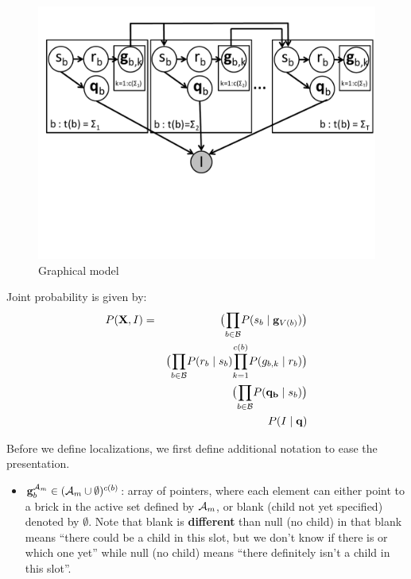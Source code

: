 \documentclass[11pt]{article}
\newcommand{\A}{{\cal A}}
\newcommand{\X}{\mathbf{X}}
\newcommand{\B}{\cal B}
\newcommand{\Am}{\A_{m}}
\begin{document}
\begin{figure}[htbp]
\begin{center}
\includegraphics[width=\textwidth, trim=0cm 6cm 0cm 0cm]{gm.pdf}
\caption{Graphical model}
\end{center}
\end{figure}

\FloatBarrier

Joint probability is given by: \\

\begin{eqnarray}
P(\X, I) &=& \big({\displaystyle \prod_{b \in {\B}}} P(s_b \mid \mathbf{g}_{V(b)}) \big ) \\
& &\big( {\displaystyle \prod_{b \in {\B}}} P(r_b \mid s_b) {\displaystyle \prod_{k=1}^{c(b)}} P(g_{b,k} \mid r_b) \big) \\
& &\big( {\displaystyle \prod_{b \in {\B}}} P(\mathbf{q_b} \mid s_b)\big) \\
& & P(I \mid \mathbf{q})
\end{eqnarray}

Before we define localizations, we first define additional notation to ease the presentation.

\begin{itemize}
\item $\mathbf{g}_b^{\Am} \in ( {\Am} \cup \emptyset )^{c(b)}$: array of pointers, where each element can either point to a brick in the active set defined by $\Am$, or blank (child not yet specified) denoted by $\emptyset$. Note that blank is \textbf{different} than null (no child) in that blank means ``there could be a child in this slot, but we don't know if there is or which one yet'' while null (no child) means ``there definitely isn't a child in this slot''.
\end{itemize}
\end{document}
